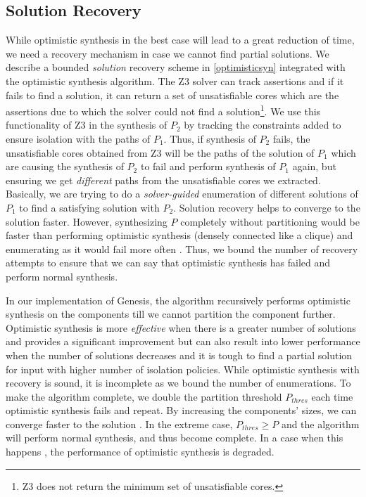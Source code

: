 \subsection{Solution Recovery}
While optimistic synthesis in the best case will lead to a great
reduction of time, we need a recovery mechanism in case we cannot find
partial solutions.  We describe a bounded \emph{solution} recovery
scheme in \cref{optimisticsyn} integrated with the optimistic
synthesis algorithm.  The Z3 solver can track assertions and if it
fails to find a solution, it can return a set of unsatisfiable cores
which are the assertions due to which the solver could not find a
solution\footnote{Z3 does not return the minimum set of unsatisfiable
  cores.}.  We use this functionality of Z3 in the synthesis of $P_2$
by tracking the constraints added to ensure isolation with the paths
of $P_1$.  Thus, if synthesis of $P_2$ fails, the unsatisfiable cores
obtained from Z3 will be the paths of the solution of $P_1$ which are
causing the synthesis of $P_2$ to fail and perform synthesis of $P_1$
again, but ensuring we get \emph{different} paths from the
unsatisfiable cores we extracted.  Basically, we are trying to do a
\emph{solver-guided} enumeration of different solutions of $P_1$ to
find a satisfying solution with $P_2$.  Solution recovery helps to
converge to the solution faster. However, synthesizing $P$ completely
without partitioning would be faster than performing optimistic
synthesis (densely connected like a clique) and enumerating as it
would fail more often . Thus, we
bound the number of recovery attempts to ensure that we can say that
optimistic synthesis has failed and perform normal
synthesis. 
 
 In our implementation of Genesis, the algorithm recursively performs
 optimistic synthesis on the components till we cannot partition the
 component further.  Optimistic synthesis is more \emph{effective}
 when there is a greater number of solutions and provides a
 significant improvement but can also result into lower performance
 when the number of solutions decreases and  it is tough to find a partial solution for
 input with higher number of isolation policies. While optimistic
 synthesis with recovery is sound, it is incomplete as we bound the
 number of enumerations. To make the algorithm complete, we double the
 partition threshold $P_{thres}$ each time optimistic synthesis fails
 and repeat.  By increasing the
 components' sizes, we can converge faster to the solution . In the extreme
 case, $P_{thres} \geq P$ and the algorithm will perform normal
 synthesis, and thus become complete. In a case when this happens
 , the
 performance of optimistic synthesis is degraded.

 
%
